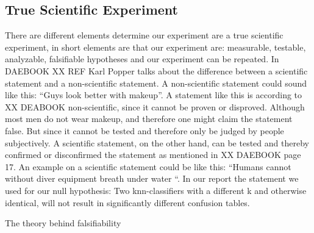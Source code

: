 \subsection{True Scientific Experiment}
There are different elements determine our experiment are a true scientific experiment, in short elements are that our experiment are: measurable, testable, analyzable, falsifiable hypotheses and our experiment can be repeated.
In DAEBOOK XX REF Karl Popper talks about the difference between a scientific statement and a non-scientific statement. A non-scientific statement could sound like this: “Guys look better with makeup”. A statement like this is according to XX DEABOOK non-scientific, since it cannot be proven or disproved. Although most men do not wear makeup, and therefore one might claim the statement false. But since it cannot be tested and therefore only be judged by people subjectively. 
A scientific statement, on the other hand, can be tested and thereby confirmed or disconfirmed the statement as mentioned in XX DAEBOOK page 17. An example on a scientific statement could be like this: “Humans cannot without diver equipment breath under water “.
In our report the statement we used for our null hypothesis: Two knn-classifiers with a different k and otherwise identical, will not result in significantly different confusion tables. 

The theory behind falsifiability 
